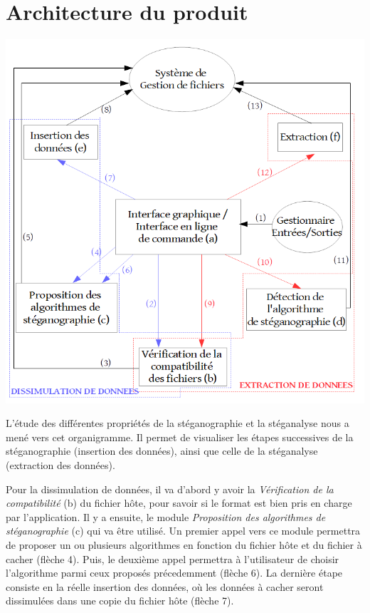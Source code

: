 \documentclass[11pt]{article}
\begin{document}
\section{Architecture du produit}

\hspace{0.5cm}
\includegraphics[scale=0.55]{pictures/organigramme.png}
\newpage

L'étude des différentes propriétés de la stéganographie et la stéganalyse 
nous a mené vers cet organigramme. 
Il permet de visualiser les étapes successives de la stéganographie 
(insertion des données), ainsi que celle de la stéganalyse (extraction 
des données). 

Pour la dissimulation de données, il va d'abord y avoir la \textit{Vérification 
de la compatibilité} (b) du fichier hôte, pour savoir si le format est bien 
pris en charge par l'application. 
Il y a ensuite, le module \textit{Proposition des algorithmes de stéganographie} 
(c) qui va être utilisé. Un premier appel vers ce module permettra de proposer 
un ou plusieurs algorithmes en fonction du fichier hôte et du fichier à cacher (flèche 4). 
Puis, le deuxième appel permettra à l'utilisateur de choisir l'algorithme 
parmi ceux proposés précedemment (flèche 6). 
La dernière étape consiste en la réelle insertion des données, où les 
données à cacher seront dissimulées dans une copie du fichier hôte (flèche 7). 
\end{document}
